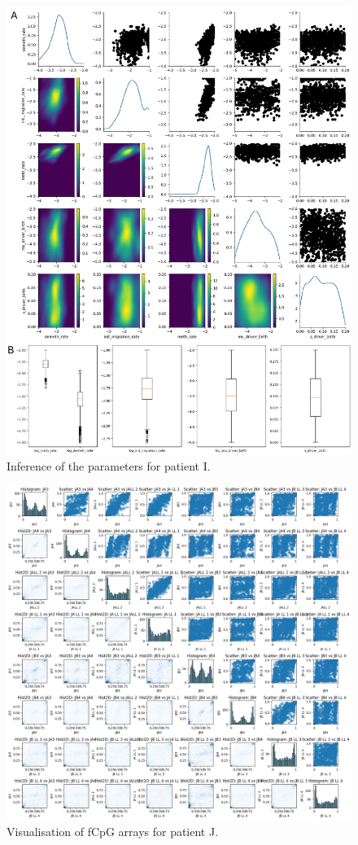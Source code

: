 \begin{figure}[h]
\centering
\includegraphics[width=\textwidth]{Chapter_5/figures/inference_I.pdf}
\caption{Inference of the parameters for patient I.}
\label{fig:inference_I}
\end{figure}

\begin{figure}[ht]
\centering
\includegraphics[width=\textwidth]{Chapter_5/figures/fCpG_loci_J.png}
\caption{Visualisation of fCpG arrays for patient J.}
\label{fig:vis_J}
\end{figure}

